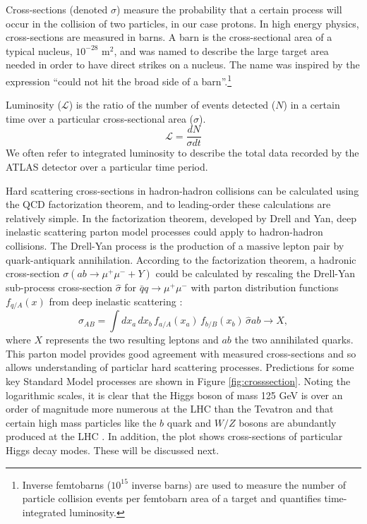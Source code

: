 Cross-sections (denoted $\sigma$) measure the probability that a certain process will occur in the collision of two particles, in our case protons. In high energy physics, cross-sections are measured in barns. A barn is the cross-sectional area of a typical nucleus, $10^{-28}$ m$^2$, and was named to describe the large target area needed in order to have direct strikes on a nucleus. The name was inspired by the expression ``could not hit the broad side of a barn''.\footnote{Inverse femtobarns ($10^{15}$ inverse barns) are used to measure the number of particle collision events per femtobarn area of a target and quantifies time-integrated luminosity.} 

Luminosity ($\mathcal{L}$) is the ratio of the number of events detected ($N$) in a certain time over a particular cross-sectional area ($\sigma$). 
\begin{equation}
\mathcal{L} = \frac{dN}{\sigma dt}
\end{equation} 
We often refer to integrated luminosity to describe the total data recorded by the ATLAS detector over a particular time period. 

Hard scattering cross-sections in hadron-hadron collisions can be calculated using the QCD factorization theorem, and to leading-order these calculations are relatively simple. In the factorization theorem, developed by Drell and Yan, deep inelastic scattering parton model processes could apply to hadron-hadron collisions. The Drell-Yan process is the production of a massive lepton pair by quark-antiquark annihilation. According to the factorization theorem, a hadronic cross-section $\sigma(ab\rightarrow \mu^+\mu^-+Y)$ could be calculated by rescaling the Drell-Yan sub-process cross-section $\hat{\sigma}$ for $\bar{q}q\rightarrow\mu^+\mu^-$ with parton distribution functions $f_{q/A}(x)$ from deep inelastic scattering \cite{Campbell}:
\begin{equation}
\sigma_{AB} = \int dx_a \, dx_b \, f_{a/A}(x_a) \, f_{b/B}(x_b) \,\hat{\sigma}{ab\rightarrow X},
\end{equation}
where $X$ represents the two resulting leptons and $ab$ the two annihilated quarks. This parton model provides good agreement with measured cross-sections and so allows understanding of particlar hard scattering processes. Predictions for some key Standard Model processes are shown in Figure \ref{fig:crosssection}. Noting the logarithmic scales, it is clear that the Higgs boson of mass 125 GeV is over an order of magnitude more numerous at the LHC than the Tevatron and that certain high mass particles like the $b$ quark and $W/Z$ bosons are abundantly produced at the LHC \cite{Campbell}. In addition, the plot shows cross-sections of particular Higgs decay modes. These will be discussed next.
 
